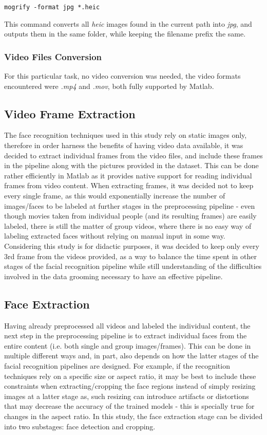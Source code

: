 \documentclass[11pt]{article}
\begin{document}
        \texttt{mogrify  -format jpg   *.heic}

        This command converts all \textit{heic} images found in the current path into \textit{jpg}, and outputs them in the same folder, while keeping the filename prefix the same.

    \subsubsection{Video Files Conversion}
        For this particular task, no video conversion was needed, the video formats encountered were \textit{.mp4} and \textit{.mov}, both fully supported by Matlab.

    \subsection{Video Frame Extraction}
        The face recognition techniques used in this study rely on static images only, therefore in order harness the benefits of having video data available, it was decided to extract individual frames from the video files, and include these frames in the pipeline along with the pictures provided in the dataset. This can be done rather efficiently in Matlab as it provides native support for reading individual frames from video content. When extracting frames, it was decided not to keep every single frame, as this would exponentially increase the number of images/faces to be labeled at further stages in the preprocessing pipeline - even though movies taken from individual people (and its resulting frames) are easily labeled, there is still the matter of group videos, where there is no easy way of labeling extracted faces without relying on manual input in some way. Considering this study is for didactic purposes, it was decided to keep only every 3rd frame from the videos provided, as a way to balance the time spent in other stages of the facial recognition pipeline while still understanding of the difficulties involved in the data grooming necessary to have an effective pipeline.

    \subsection{Face Extraction}
        Having already preprocessed all videos and labeled the individual content, the next step in the preprocessing pipeline is to extract individual faces from the entire content (i.e. both single and group images/frames). This can be done in multiple different ways and, in part, also depends on how the latter stages of the facial recognition pipelines are designed. For example, if the recognition techniques rely on a specific size or aspect ratio, it may be best to include these constraints when extracting/cropping the face regions instead of simply resizing images at a latter stage as, such resizing can introduce artifacts or distortions that may decrease the accuracy of the trained models - this is specially true for changes in the aspect ratio. In this study, the face extraction stage can be divided into two substages: face detection and cropping.
\end{document}
